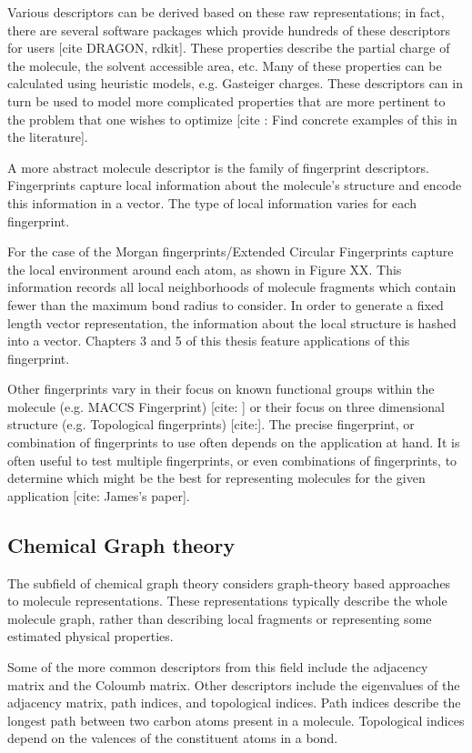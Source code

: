Various descriptors can be derived based on these raw representations; in fact, there are several software packages which provide hundreds of these descriptors for users [cite DRAGON, rdkit]. These properties describe the partial charge of the molecule, the solvent accessible area, etc. Many of these properties can be calculated using heuristic models, e.g. Gasteiger charges. These descriptors can in turn be used to model more complicated properties that are more pertinent to the problem that one wishes to optimize [cite : Find concrete examples of this in the literature].

A more abstract molecule descriptor is the family of fingerprint descriptors. Fingerprints capture local information about the molecule's structure and encode this information in a vector. The type of local information varies for each fingerprint. 

For the case of the Morgan fingerprints/Extended Circular Fingerprints capture the local environment around each atom, as shown in Figure XX. This information records all local neighborhoods of molecule fragments which contain fewer than the maximum bond radius to consider. In order to generate a fixed length vector representation, the information about the local structure is hashed into a vector. Chapters 3 and 5 of this thesis feature applications of this fingerprint.

Other fingerprints vary in their focus on known functional groups within the molecule (e.g. MACCS Fingerprint) [cite: ] or their focus on three dimensional structure (e.g. Topological fingerprints) [cite:]. The precise fingerprint, or combination of fingerprints to use often depends on the application at hand. It is often useful to test multiple fingerprints, or even combinations of fingerprints, to determine which might be the best for representing molecules for the given application [cite: James's paper].


\subsection{Chemical Graph theory}

The subfield of chemical graph theory considers graph-theory based approaches to molecule representations. These representations typically describe the whole molecule graph, rather than describing local fragments or representing some estimated physical properties.

Some of the more common descriptors from this field include the adjacency matrix and the Coloumb matrix. Other descriptors include the eigenvalues of the adjacency matrix, path indices, and topological indices. Path indices describe the longest path between two carbon atoms present in a molecule. Topological indices depend on the valences of the constituent atoms in a bond. 

